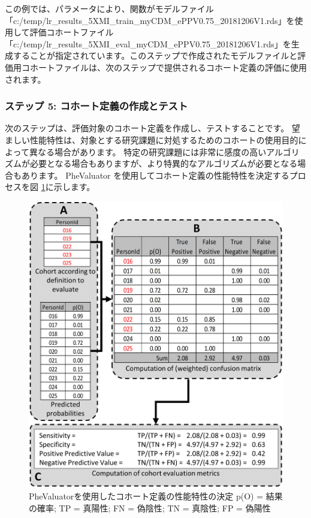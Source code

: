 \documentclass[
  11pt]{book}
\theoremstyle{definition}
\theoremstyle{definition}
\theoremstyle{definition}
\theoremstyle{definition}
\theoremstyle{remark}
\begin{document}
この例では、パラメータにより、関数がモデルファイル「c:/temp/lr\_results\_5XMI\_train\_myCDM\_ePPV0.75\_20181206V1.rds」を使用して評価コホートファイル「c:/temp/lr\_results\_5XMI\_eval\_myCDM\_ePPV0.75\_20181206V1.rds」を生成することが指定されています。このステップで作成されたモデルファイルと評価用コホートファイルは、次のステップで提供されるコホート定義の評価に使用されます。

\subsubsection*{ステップ 5: コホート定義の作成とテスト}\label{ux30b9ux30c6ux30c3ux30d7-5-ux30b3ux30dbux30fcux30c8ux5b9aux7fa9ux306eux4f5cux6210ux3068ux30c6ux30b9ux30c8}

次のステップは、評価対象のコホート定義を作成し、テストすることです。 望ましい性能特性は、対象とする研究課題に対処するためのコホートの使用目的によって異なる場合があります。 特定の研究課題には非常に感度の高いアルゴリズムが必要となる場合もありますが、より特異的なアルゴリズムが必要となる場合もあります。 PheValuator を使用してコホート定義の性能特性を決定するプロセスを図 \ref{fig:phevaluatorDiagram}に示します。

\begin{figure}

{\centering \includegraphics[width=1\linewidth]{images/ClinicalValidity/PheValuatorEvaluation} 

}

\caption{PheValuatorを使用したコホート定義の性能特性の決定 p(O) = 結果の確率; TP = 真陽性; FN = 偽陰性; TN = 真陰性; FP = 偽陽性}\label{fig:phevaluatorDiagram}
\end{figure}
\end{document}
